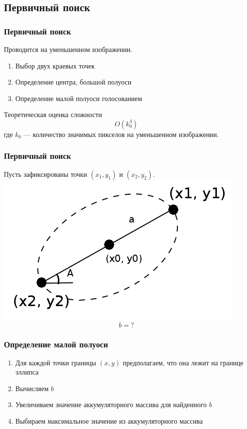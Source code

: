 \documentclass[14pt]{beamer}
\begin{document}
\subsection{Первичный поиск}
\begin{frame}
\frametitle{Первичный поиск}
Проводится на уменьшенном изображении.
\begin{block}{}
\begin{enumerate}
  \item Выбор двух краевых точек
  \item Определение центра, большой полуоси
  \item Определение малой полуоси голосованием
\end{enumerate}
\end{block}
\begin{block}{Теоретическая оценка сложности}
$$O(k_0^3)$$ где $k_0$ --- количество значимых пикселов на уменьшенном изображении.
\end{block}
\end{frame}

\begin{frame}
\frametitle{Первичный поиск}
Пусть зафиксированы точки $(x_1, y_1)$ и $(x_2, y_2)$.
  \center
\includegraphics[width=0.40\linewidth]{ellipse1}
$$b = ?$$
\end{frame}

\begin{frame}
\frametitle{Определение малой полуоси}
\begin{block}{}
\begin{enumerate}
  \item Для каждой точки границы $(x, y)$ предполагаем, что она лежит на границе эллипса
  \item Вычисляем $b$
  \item Увеличиваем значение аккумуляторного массива для найденного $b$
  \item Выбираем максимальное значение из аккумуляторного массива
\end{enumerate}
\end{block}
\end{frame}
\end{document}
